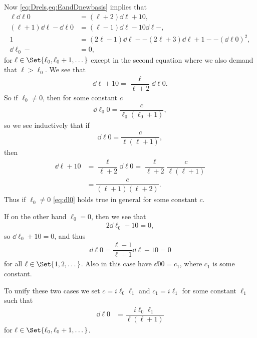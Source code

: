 Now \cref{eq:Drels,eq:EandDnewbasis} implies that
\begin{align*}
  \ell \dd{\ell}{0} &= (\ell+2)\dd{\ell+1}{0}, \\
  (\ell+1)\dd{\ell}{-}\dd{\ell}{0} &= (\ell-1)\dd{\ell-1}{0}\dd{\ell}{-}, \\
  1 &= (2\ell-1)\dd{\ell}{-} - (2\ell+3)\dd{\ell+1}{-} - (\dd{\ell}{0})^2,\\
  \dd{\ell_0}{-} &= 0,
\end{align*}
for $\ell\in\Set{\ell_0,\ell_0+1,\dotsc}$ except in the second equation where we also demand that $\ell>\ell_0$. We see that
\begin{align*}
  \dd{\ell+1}{0} = \dfrac{\ell}{\ell+2}\dd{\ell}{0}.
\end{align*}
So if $\ell_0\neq0$, then for some constant $c$ 
\begin{align*}
  \dd{\ell_0}{0} = \dfrac{c}{\ell_0(\ell_0+1)},
\end{align*}
so we see inductively that if
\begin{align}\label{eq:dl0}
  \dd{\ell}{0} = \dfrac{c}{\ell(\ell+1)},
\end{align}
then
\begin{align*}
  \dd{\ell+1}{0} &= \dfrac{\ell}{\ell+2}\dd{\ell}{0} = \dfrac{\ell}{\ell+2}\dfrac{c}{\ell(\ell+1)} \\
  &= \dfrac{c}{(\ell+1)(\ell+2)}.
\end{align*}
Thus if $\ell_0\neq 0$ \cref{eq:dl0} holds true in general for some constant $c$. 

If on the other hand $\ell_0=0$, then we see that
\begin{align*}
  2\dd{\ell_0+1}{0} = 0,
\end{align*}
so $\dd{\ell_0+1}{0}=0$, and thus
\begin{align*}
  \dd{\ell}{0} = \dfrac{\ell-1}{\ell+1}\dd{\ell-1}{0} = 0
\end{align*}
for all $\ell\in\Set{1,2,\dotsc}$. Also in this case have $\dd{0}{0}=c_1$, where $c_1$ is some constant. 

To unify these two cases we set $c=i\ell_0\ell_1$ and $c_1=i\ell_1$ for some constant $\ell_1$ such that
\begin{align*}
  \dd{\ell}{0} &= \dfrac{i\ell_0\ell_1}{\ell(\ell+1)}
\end{align*}
for $\ell\in\Set{\ell_0,\ell_0+1,\dotsc}$. 


